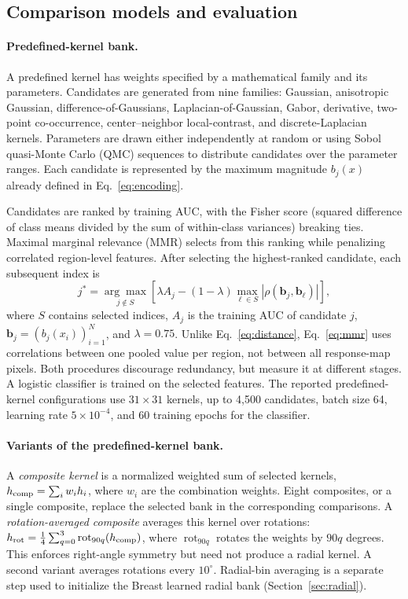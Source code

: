 \documentclass[10pt,twocolumn]{article}
\begin{document}
\subsection{Comparison models and evaluation}
\label{sec:baselines}
\paragraph{Predefined-kernel bank.}
A predefined kernel has weights specified by a mathematical family and its parameters. Candidates are generated from nine families: Gaussian, anisotropic Gaussian, difference-of-Gaussians, Laplacian-of-Gaussian, Gabor, derivative, two-point co-occurrence, center--neighbor local-contrast, and discrete-Laplacian kernels. Parameters are drawn either independently at random or using Sobol quasi-Monte Carlo (QMC) sequences to distribute candidates over the parameter ranges. Each candidate is represented by the maximum magnitude $b_j(x)$ already defined in Eq.~\eqref{eq:encoding}.

Candidates are ranked by training AUC, with the Fisher score (squared difference of class means divided by the sum of within-class variances) breaking ties. Maximal marginal relevance (MMR) \cite{carbonell1998} selects from this ranking while penalizing correlated region-level features. After selecting the highest-ranked candidate, each subsequent index is
\begin{equation}
 j^*=\underset{j\notin S}{\arg\max}\left[
 \lambda A_j-(1-\lambda)\max_{\ell\in S}|\rho(\mathbf b_j,\mathbf b_\ell)|\right],
\label{eq:mmr}
\end{equation}
where $S$ contains selected indices, $A_j$ is the training AUC of candidate $j$, $\mathbf b_j=(b_j(x_i))_{i=1}^{N}$, and $\lambda=0.75$. Unlike Eq.~\eqref{eq:distance}, Eq.~\eqref{eq:mmr} uses correlations between one pooled value per region, not between all response-map pixels. Both procedures discourage redundancy, but measure it at different stages. A logistic classifier is trained on the selected features. The reported predefined-kernel configurations use $31\times31$ kernels, up to 4,500 candidates, batch size 64, learning rate $5\times10^{-4}$, and 60 training epochs for the classifier.

\paragraph{Variants of the predefined-kernel bank.}
A \emph{composite kernel} is a normalized weighted sum of selected kernels, $h_{\rm comp}=\sum_i w_i h_i$, where $w_i$ are the combination weights. Eight composites, or a single composite, replace the selected bank in the corresponding comparisons. A \emph{rotation-averaged composite} averages this kernel over rotations: $h_{\rm rot}=\frac14\sum_{q=0}^3\operatorname{rot}_{90q}(h_{\rm comp})$, where $\operatorname{rot}_{90q}$ rotates the weights by $90q$ degrees. This enforces right-angle symmetry but need not produce a radial kernel. A second variant averages rotations every $10^\circ$. Radial-bin averaging is a separate step used to initialize the Breast learned radial bank (Section~\ref{sec:radial}).
\end{document}
